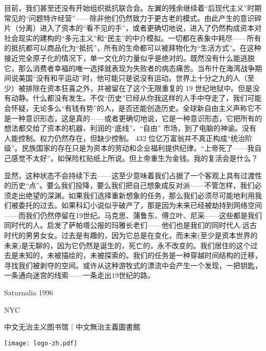 \documentclass[DIV=12,%
               BCOR=0mm,%
               headinclude=false,%
               footinclude=false,open=any,%
               fontsize=10pt,%
               oneside,%
               paper=210mm:11in]%
               {scrbook}
\begin{document}
目前，我们甚至还没有开始组织抵抗联合会。左翼的残余继续着“后现代主义”时期常见的“问题特许经营”——除非他们仍然致力于更古老的模式。由此产生的意识碎片（分离）进入了资本的“看不见的手”，或者更确切地说，进入了仍然构成资本对社会现实的建构的“多元主义”和“民主”的中介模拟。一切都在表象中耗尽——所有的抵抗都可以商品化为“抵抗”，所有的生命都可以被拜物化为“生活方式”。在这种接近完全原子化的情况下，单一文化的力量似乎是绝对的。既然没有什么能逃脱它，那么消费者幸福的唯一选择就表现为失败者的病态痛苦。当布什在海湾战争期间说美国“没有和平运动”时，他可能只是说没有运动。世界上十分之九的人（至少）被排除在资本狂喜之外，并被留在了这个无限重复的 19 世纪地狱中。但是没有动静。什么都没有发生。不仅“历史”已经从你我这样的人手中夺走了，我们可能会怀疑，无论多么“有钱有势”的人，是否还能创造历史。全球新自由主义声称它不是一种意识形态，这是真的——或者更确切地说，它是一种意识形态，它把所有的想法都交给了资本的机器、利润的“底线”、“自由” 市场，到了电脑的神谕。没有人能控制。权力仍然存在，但缺少控制。 432 位亿万富翁并不真正构成“统治阶级”。民族国家的存在只是为资本的劳动和企业福利提供纪律。“上帝死了——我自己感觉不太好”，如保险杠贴纸上所说。但上帝重生为金钱。我的复活会是什么？


显然，这种状态不会持续下去——这至少意味着我们占据了一个客观上具有过渡性的历史“点”。要么我们投降，要么我们把自己想象成反对派——不管怎样，我们必须走出绝望的深渊。如果我们选择重新想象的任务，那么我们必须尽可能地利用我们被委托的过去。如果科幻小说似乎破产了，那是因为未来已经被劫持到网络空间——而我们仍然停留在19世纪。马克思、蒲鲁东、傅立叶、尼采——这些都是我们同时代的人。启发了萨帕塔公报的玛雅长老们——他们也是我们的同时代人:远古时代的男男女女。过去是有趣的，因为它总是在变化，而未来(至少是资本世界的未来)是无聊的，因为它仍然是诞生的，死亡的，永不改变的。我们居住的这个过去是未知的，未被描绘的，未被探索的。我们的任务是一种穿越时间结构的迁移，寻找我们被剥夺的空间。或许从这种游牧式的漂流中会产生一个发现，一把钥匙，一条通向迷宫的线索——一条走出19世纪的路。


Saturnalia 1996


NYC










\clearpage




\thispagestyle{empty}

\begin{center}

中文无治主义图书馆｜中文無治主義圖書館





\bigskip
\texttt{[image: logo-zh.pdf]}
\bigskip

\end{center}
\end{document}
